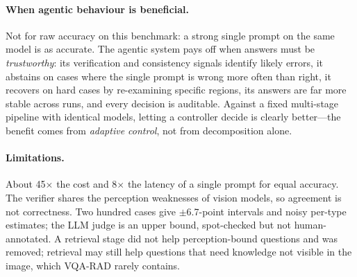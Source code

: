 \paragraph{When agentic behaviour is beneficial.} Not for raw accuracy on this benchmark: a strong single prompt on
the same model is as accurate. The agentic system pays off when answers must be \emph{trustworthy}: its
verification and consistency signals identify likely errors, it abstains on cases where the single prompt is wrong
more often than right, it recovers on hard cases by re-examining specific regions, its answers are far more stable
across runs, and every decision is auditable. Against a fixed multi-stage pipeline with identical models, letting a
controller decide is clearly better---the benefit comes from \emph{adaptive control}, not from decomposition alone.

\paragraph{Limitations.} About 45$\times$ the cost and 8$\times$ the latency of a single prompt for equal accuracy.
The verifier shares the perception weaknesses of vision models, so agreement is not correctness. Two hundred cases
give $\pm$6.7-point intervals and noisy per-type estimates; the LLM judge is an upper bound, spot-checked but not
human-annotated. A retrieval stage did not help perception-bound questions and was removed; retrieval may still
help questions that need knowledge not visible in the image, which VQA-RAD rarely contains.
